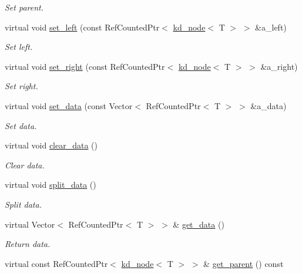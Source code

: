 \begin{DoxyCompactItemize}
\begin{DoxyCompactList}\small\item\em Set parent. \end{DoxyCompactList}\item 
virtual void \hyperlink{classkd__node_ad982e9f9e559fb23076a29119de3414c}{set\+\_\+left} (const Ref\+Counted\+Ptr$<$ \hyperlink{classkd__node}{kd\+\_\+node}$<$ T $>$ $>$ \&a\+\_\+left)
\begin{DoxyCompactList}\small\item\em Set left. \end{DoxyCompactList}\item 
virtual void \hyperlink{classkd__node_a324a2ca467fc9f7fce6305f47147385c}{set\+\_\+right} (const Ref\+Counted\+Ptr$<$ \hyperlink{classkd__node}{kd\+\_\+node}$<$ T $>$ $>$ \&a\+\_\+right)
\begin{DoxyCompactList}\small\item\em Set right. \end{DoxyCompactList}\item 
virtual void \hyperlink{classkd__node_a9120d3dc6c0b81d8eac9ddc05a04c0f2}{set\+\_\+data} (const Vector$<$ Ref\+Counted\+Ptr$<$ T $>$ $>$ \&a\+\_\+data)
\begin{DoxyCompactList}\small\item\em Set data. \end{DoxyCompactList}\item 
virtual void \hyperlink{classkd__node_a3e190f289ebf2240df2c80917ea6bb97}{clear\+\_\+data} ()
\begin{DoxyCompactList}\small\item\em Clear data. \end{DoxyCompactList}\item 
virtual void \hyperlink{classkd__node_ae401e6fa3f0d199f02eb1d16f38c7a6e}{split\+\_\+data} ()
\begin{DoxyCompactList}\small\item\em Split data. \end{DoxyCompactList}\item 
virtual Vector$<$ Ref\+Counted\+Ptr$<$ T $>$ $>$ \& \hyperlink{classkd__node_a4e6184887b06cb8c7318c31d73dfcf41}{get\+\_\+data} ()
\begin{DoxyCompactList}\small\item\em Return data. \end{DoxyCompactList}\item 
virtual const Ref\+Counted\+Ptr$<$ \hyperlink{classkd__node}{kd\+\_\+node}$<$ T $>$ $>$ \& \hyperlink{classkd__node_a251cbbb84e32c1fc8b8c0afe35ce0528}{get\+\_\+parent} () const 

\end{DoxyCompactItemize}
